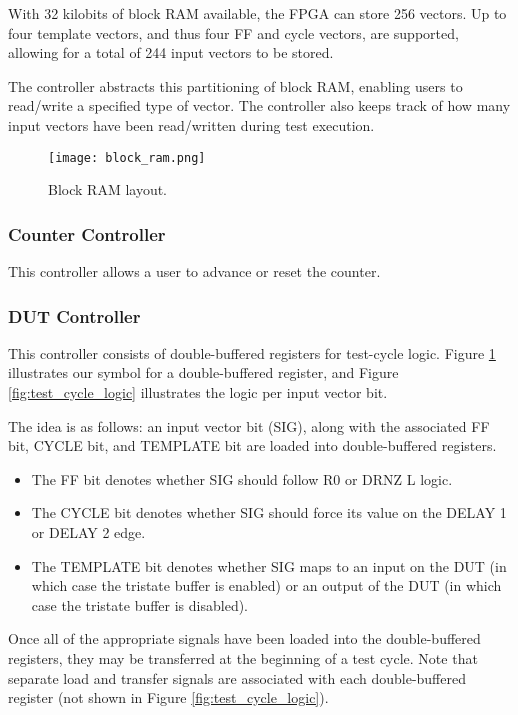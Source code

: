 With 32 kilobits of block RAM available, the FPGA can store 256 vectors. Up to four template vectors, and thus four FF and cycle vectors, are supported, allowing for a total of 244 input vectors to be stored.

The controller abstracts this partitioning of block RAM, enabling users to read/write a specified type of vector. The controller also keeps track of how many input vectors have been read/written during test execution.

\begin{figure}
\texttt{[image: block\_ram.png]}
\caption{Block RAM layout.}
\label{fig:block_ram_layout}
\end{figure}

\subsubsection{Counter Controller}
This controller allows a user to advance or reset the counter.

\subsubsection{DUT Controller}
This controller consists of double-buffered registers for test-cycle logic. Figure \ref{fig:block_ram_layout} illustrates our symbol for a double-buffered register, and Figure \ref{fig:test_cycle_logic} illustrates the logic per input vector bit.

The idea is as follows: an input vector bit (SIG), along with the associated FF bit, CYCLE bit, and TEMPLATE bit are loaded into double-buffered registers. 
\begin{itemize}
\item The FF bit denotes whether SIG should follow R0 or DRNZ L logic.
\item The CYCLE bit denotes whether SIG should force its value on the DELAY 1 or DELAY 2 edge. 
\item The TEMPLATE bit denotes whether SIG maps to an input on the DUT (in which case the tristate buffer is enabled) or an output of the DUT (in which case the tristate buffer is disabled).
\end{itemize}

Once all of the appropriate signals have been loaded into the double-buffered registers, they may be transferred at the beginning of a test cycle. Note that separate load and transfer signals are associated with each double-buffered register (not shown in Figure \ref{fig:test_cycle_logic}). 

